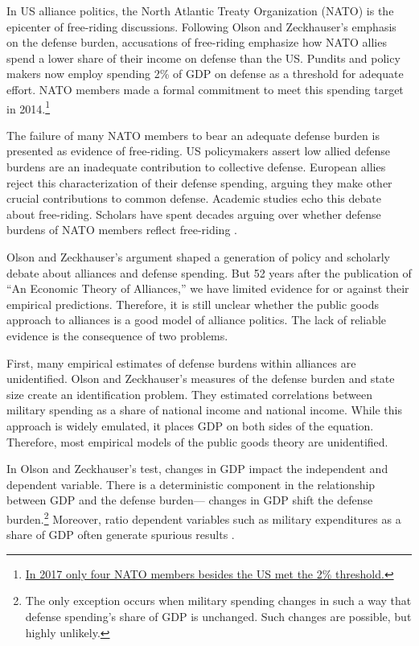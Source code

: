 \documentclass[12pt]{article}
\begin{document}
In US alliance politics, the North Atlantic Treaty Organization (NATO) is the epicenter of free-riding discussions. 
Following Olson and Zeckhauser's emphasis on the defense burden, accusations of free-riding emphasize how NATO allies spend a lower share of their income on defense than the US. 
Pundits and policy makers now employ spending 2\% of GDP on defense as a threshold for adequate effort.
NATO members made a formal commitment to meet this spending target in 2014.\footnote{
\href{https://www.economist.com/graphic-detail/2017/02/16/military-spending-by-nato-members}{In 2017 only four NATO members besides the US met the 2\% threshold.}}  


The failure of many NATO members to bear an adequate defense burden is presented as evidence of free-riding. 
US policymakers assert low allied defense burdens are an inadequate contribution to collective defense. 
European allies reject this characterization of their defense spending, arguing they make other crucial contributions to common defense. 
Academic studies echo this debate about free-riding.  
Scholars have spent decades arguing over whether defense burdens of NATO members reflect free-riding \citep{SandlerForbes1980, Palmer1990, GatesTerasawa1992, SandlerHartley2001, Lanoszka2015, PluemperNeumayer2015}.


Olson and Zeckhauser's argument shaped a generation of policy and scholarly debate about alliances and defense spending. 
But 52 years after the publication of ``An Economic Theory of Alliances,'' we have limited evidence for or against their empirical predictions. 
Therefore, it is still unclear whether the public goods approach to alliances is a good model of alliance politics. 
The lack of reliable evidence is the consequence of two problems. 


First, many empirical estimates of defense burdens within alliances are unidentified.
Olson and Zeckhauser's measures of the defense burden and state size create an identification problem. 
They estimated correlations between military spending as a share of national income and national income.
While this approach is widely emulated, it places GDP on both sides of the equation.
Therefore, most empirical models of the public goods theory are unidentified.


In Olson and Zeckhauser's test, changes in GDP impact the independent and dependent variable. 
There is a deterministic component in the relationship between GDP and the defense burden--- changes in GDP shift the defense burden.\footnote{
The only exception occurs when military spending changes in such a way that defense spending's share of GDP is unchanged. Such changes are possible, but highly unlikely.}  
Moreover, ratio dependent variables such as military expenditures as a share of GDP often generate spurious results \citep{Kronmal1993}. 
\end{document}
